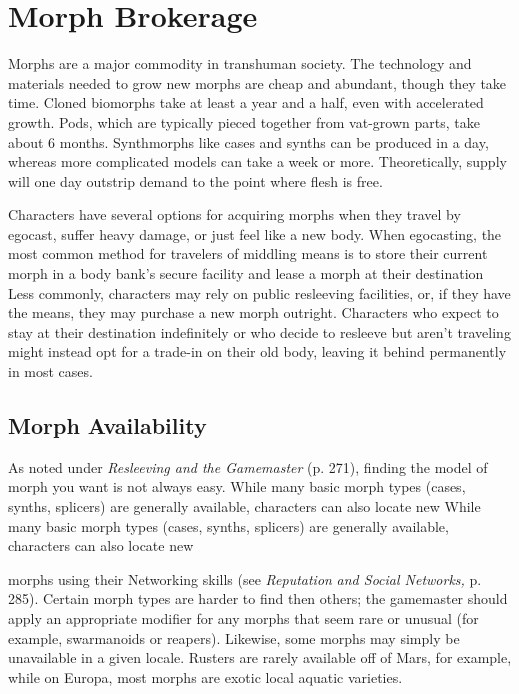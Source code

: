 \section{Morph Brokerage} 

Morphs are a major commodity in transhuman society. The technology and materials needed to grow new morphs are cheap and abundant, though they take time. Cloned biomorphs take at least a year and a half, even with accelerated growth. Pods, which are typically pieced together from vat-grown parts, take about 6 months. Synthmorphs like cases and synths can be produced in a day, whereas more complicated models can take a week or more. Theoretically, supply will one day outstrip demand to the point where flesh is free. 

Characters have several options for acquiring morphs when they travel by egocast, suffer heavy damage, or just feel like a new body. When egocasting, the most common method for travelers of middling means is to store their current morph in a body bank's secure facility and lease a morph at their destination Less commonly, characters may rely on public resleeving facilities, or, if they have the means, they may purchase a new morph outright. Characters who expect to stay at their destination indefinitely or who decide to resleeve but aren't traveling might instead opt for a trade-in on their old body, leaving it behind permanently in most cases. 

\subsection{Morph Availability} 

As noted under \textit{Resleeving and the Gamemaster} (p. 271), finding the model of morph you want is not always easy. While many basic morph types (cases, synths, splicers) are generally available, characters can also locate new While many basic morph types (cases, synths, splicers) are generally available, characters can also locate new 

morphs using their Networking skills (see \textit{Reputation } \textit{and Social Networks,} p. 285). Certain morph types are harder to find then others; the gamemaster should apply an appropriate modifier for any morphs that seem rare or unusual (for example, swarmanoids or reapers). Likewise, some morphs may simply be unavailable in a given locale. Rusters are rarely available off of Mars, for example, while on Europa, most morphs are exotic local aquatic varieties. 


